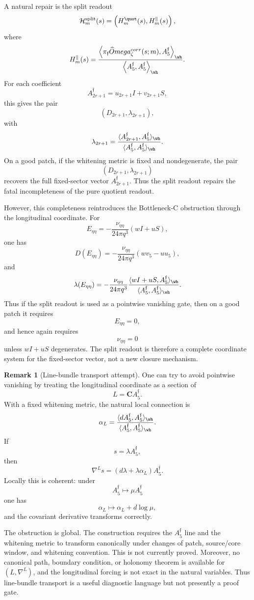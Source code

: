 \documentclass[11pt,a4paper]{amsart}
\def\Omega{Omega}%
\def\corr{corr}%
\theoremstyle{plain}
\theoremstyle{definition}
\newtheorem{remark}[theorem]{Remark}
\newcommand{\corr}{\mathrm{corr}}
\begin{document}
A natural repair is the split readout
\[
\mathcal H_m^{\mathrm{split}}(s)
=
\left(
H_m^{\quot}(s),H_m^\parallel(s)
\right),
\]
where
\[
H_m^\parallel(s)
=
\frac{
\left\langle
\pi_{\mathfrak f}\widehat\Omega_\zeta^{\corr}(s;m),
A_5^{\mathfrak f}
\right\rangle_{\wh}
}{
\left\langle
A_5^{\mathfrak f},A_5^{\mathfrak f}
\right\rangle_{\wh}
}.
\]
For each coefficient
\[
A_{2r+1}^{\mathfrak f}
=
u_{2r+1}I+v_{2r+1}S,
\]
this gives the pair
\[
\left(
D_{2r+1},\lambda_{2r+1}
\right),
\]
with
\[
\lambda_{2r+1}
=
\frac{
\langle A_{2r+1}^{\mathfrak f},A_5^{\mathfrak f}\rangle_{\wh}
}{
\langle A_5^{\mathfrak f},A_5^{\mathfrak f}\rangle_{\wh}
}.
\]
On a good patch, if the whitening metric is fixed and nondegenerate, the pair
\[
(D_{2r+1},\lambda_{2r+1})
\]
recovers the full fixed-sector vector \(A_{2r+1}^{\mathfrak f}\).  Thus the
split readout repairs the fatal incompleteness of the pure quotient readout.

However, this completeness reintroduces the Bottleneck-C obstruction through
the longitudinal coordinate.  For
\[
E_{\eta\eta}
=
-\frac{\nu_{\eta\eta}}{24\pi q^3}(wI+uS),
\]
one has
\[
D(E_{\eta\eta})
=
-\frac{\nu_{\eta\eta}}{24\pi q^3}(wv_5-u u_5),
\]
and
\[
\lambda(E_{\eta\eta})
=
-\frac{\nu_{\eta\eta}}{24\pi q^3}
\frac{
\langle wI+uS,A_5^{\mathfrak f}\rangle_{\wh}
}{
\langle A_5^{\mathfrak f},A_5^{\mathfrak f}\rangle_{\wh}
}.
\]
Thus if the split readout is used as a pointwise vanishing gate, then on a
good patch it requires
\[
E_{\eta\eta}=0,
\]
and hence again requires
\[
\nu_{\eta\eta}=0
\]
unless \(wI+uS\) degenerates.  The split readout is therefore a complete
coordinate system for the fixed-sector vector, not a new closure mechanism.

\begin{remark}[Line-bundle transport attempt]
\label{rem:line-bundle-transport-attempt}
One can try to avoid pointwise vanishing by treating the longitudinal
coordinate as a section of
\[
L=\mathbf C A_5^{\mathfrak f}.
\]
With a fixed whitening metric, the natural local connection is
\[
\alpha_L
=
\frac{
\langle dA_5^{\mathfrak f},A_5^{\mathfrak f}\rangle_{\wh}
}{
\langle A_5^{\mathfrak f},A_5^{\mathfrak f}\rangle_{\wh}
}.
\]
If
\[
s=\lambda A_5^{\mathfrak f},
\]
then
\[
\nabla^Ls=(d\lambda+\lambda\alpha_L)A_5^{\mathfrak f}.
\]
Locally this is coherent: under
\[
A_5^{\mathfrak f}\mapsto \mu A_5^{\mathfrak f}
\]
one has
\[
\alpha_L\mapsto\alpha_L+d\log\mu,
\]
and the covariant derivative transforms correctly.

The obstruction is global.  The construction requires the \(A_5^{\mathfrak f}\)
line and the whitening metric to transform canonically under changes of patch,
source/core window, and whitening convention.  This is not currently proved.
Moreover, no canonical path, boundary condition, or holonomy theorem is
available for \((L,\nabla^L)\), and the longitudinal forcing is not exact in
the natural variables.  Thus line-bundle transport is a useful diagnostic
language but not presently a proof gate.
\end{remark}
\end{document}
